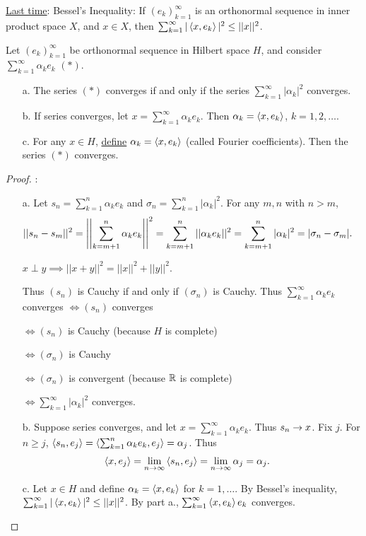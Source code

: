 \documentclass[]{article}
\begin{document}
\ul{Last time}: Bessel's Inequality: If $(e_k)_{k=1}^\infty$ is an orthonormal sequence in inner product space $X$, and $x\in X$, then $\sum_{k=1}^\infty|\left\langle x,e_k \right\rangle|^2\leq ||x||^2$.

\begin{recall}
	Let $(e_k)_{k=1}^\infty$ be orthonormal sequence in Hilbert space $H$, and consider $\sum_{k=1}^\infty \alpha_ke_k$ $(*)$.
	\begin{enumerate}
		\item[a.] The series $(*)$ converges if and only if the series $\sum_{k=1}^\infty |\alpha_k|^2$ converges.
		\item[b.] If series converges, let $x=\sum_{k=1}^\infty \alpha_ke_k$.
			Then $\alpha_k = \left\langle x,e_k \right\rangle$, $k=1,2,\dots$.
		\item[c.] For any $x\in H$, \ul{define} $\alpha_k = \left\langle x,e_k \right\rangle$ (called Fourier coefficients). Then the series $(*)$ converges.
	\end{enumerate}
\end{recall}

\begin{proof}:
	\begin{enumerate}
		\item[a.] Let $s_n = \sum_{k=1}^n \alpha_ke_k$ and $\sigma_n = \sum_{k=1}^n |\alpha_k|^2$.
			For any $m,n$ with $n>m$,
			\begin{align*}
				||s_n-s_m||^2 &= \left|\left|\sum_{k=m+1}^n \alpha_ke_k\right|\right|^2
							  = \sum_{k=m+1}^n ||\alpha_ke_k||^2
							  = \sum_{k=m+1}^n |\alpha_k|^2
							  = |\sigma_n-\sigma_m|.
			\end{align*}
			\begin{recall}
				$x\perp y \implies ||x+y||^2 = ||x||^2+||y||^2$.
			\end{recall}
			Thus $(s_n)$ is Cauchy if and only if $(\sigma_n)$ is Cauchy.
			Thus $\sum_{k=1}^\infty \alpha_ke_k$ converges $\iff (s_n)$ converges

				$\iff (s_n)$ is Cauchy (because $H$ is complete)

				$\iff (\sigma_n)$ is Cauchy

				$\iff (\sigma_n)$ is convergent (because $\mathbb{R}$ is complete)

				$\iff \sum_{k=1}^\infty|\alpha_k|^2$ converges.
		
		\item[b.] Suppose series converges, and let $x=\sum_{k=1}^\infty\alpha_ke_k$.
			Thus $s_n\rightarrow x$. Fix $j$. For $n\geq j$, $\left\langle s_n,e_j \right\rangle = \left\langle \sum_{k=1}^n \alpha_ke_k,e_j \right\rangle = \alpha_j$. Thus 
			\begin{align*}
				\left\langle x,e_j \right\rangle &= \lim_{n\rightarrow\infty}\left\langle s_n,e_j \right\rangle
				= \lim_{n\rightarrow\infty} \alpha_j = \alpha_j.
			\end{align*}
		\item[c.] Let $x\in H$ and define $\alpha_k = \left\langle x,e_k \right\rangle$ for $k=1,\dots$.
			By Bessel's inequality, $\sum_{k=1}^\infty |\left\langle x,e_k \right\rangle|^2 \leq ||x||^2$.
			By part a., $\sum_{k=1}^\infty \left\langle x,e_k \right\rangle e_k$ converges.
	\end{enumerate}
\end{proof}
\end{document}
